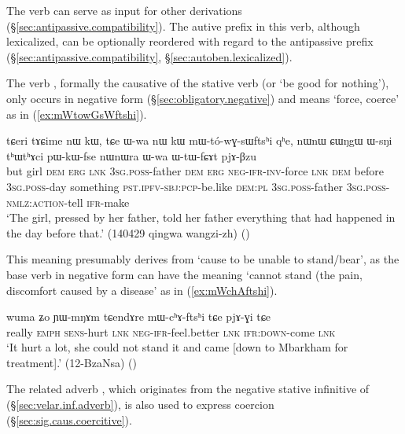 The verb  can serve as input for other derivations (§\ref{sec:antipassive.compatibility}). The autive prefix  in this verb, although lexicalized, can be optionally reordered with regard to the antipassive prefix (§\ref{sec:antipassive.compatibility}, §\ref{sec:autoben.lexicalized}).

The verb , formally the causative of the stative verb  (or `be good for nothing'), only occurs in negative form (§\ref{sec:obligatory.negative}) and means `force, coerce' as in (\ref{ex:mWtowGsWftshi}).

\begin{exe}
\ex \label{ex:mWtowGsWftshi}
 \gll   tɕeri tɤɕime nɯ kɯ, tɕe ɯ-wa nɯ kɯ mɯ-tó-wɣ-sɯftsʰi qʰe, nɯnɯ ɕɯŋgɯ ɯ-sŋi tʰɯtʰɤci pɯ-kɯ-fse nɯnɯra ɯ-wa ɯ-tɯ-fɕɤt pjɤ-βzu \\
 but girl \textsc{dem} \textsc{erg} \textsc{lnk} \textsc{3sg}.\textsc{poss}-father \textsc{dem} \textsc{erg} \textsc{neg}-\textsc{ifr}-\textsc{inv}-force \textsc{lnk} \textsc{dem} before \textsc{3sg}.\textsc{poss}-day something \textsc{pst}.\textsc{ipfv}-\textsc{sbj}:\textsc{pcp}-be.like \textsc{dem}:\textsc{pl} \textsc{3sg}.\textsc{poss}-father \textsc{3sg}.\textsc{poss}-\textsc{nmlz}:\textsc{action}-tell \textsc{ifr}-make \\
\glt `The girl, pressed by her father, told her father everything that had happened in the day before that.' (140429 qingwa wangzi-zh)
()
\end{exe}

This meaning presumably derives from `cause to be unable to stand/bear', as the base verb  in negative form can have the meaning `cannot stand (the pain, discomfort caused by a disease' as in (\ref{ex:mWchAftshi}).

\begin{exe}
\ex \label{ex:mWchAftshi}
 \gll wuma ʑo ɲɯ-mŋɤm tɕendɤre mɯ-cʰɤ-ftsʰi tɕe pjɤ-ɣi tɕe \\
 really \textsc{emph} \textsc{sens}-hurt \textsc{lnk} \textsc{neg}-\textsc{ifr}-feel.better \textsc{lnk} \textsc{ifr}:\textsc{down}-come \textsc{lnk} \\
\glt `It hurt a lot, she could not stand it and came [down to Mbarkham for treatment].' (12-BzaNsa)
()
\end{exe}

The related adverb , which originates from the negative stative infinitive of  (§\ref{sec:velar.inf.adverb}), is also used to express coercion (§\ref{sec:sig.caus.coercitive}).

